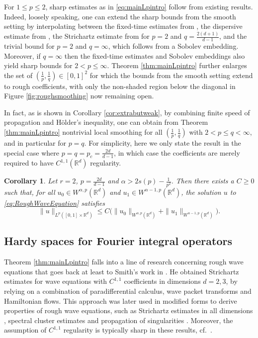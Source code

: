 \documentclass{amsart}
\numberwithin{equation}{section}
\newtheorem{corollary}[theorem]{Corollary}
\theoremstyle{definition}
\newcommand{\R}{\mathbb{R}}
\newcommand{\Rd}{\mathbb{R}^{d}}
\begin{document}
For $1\leq p\leq 2$, sharp estimates as in \eqref{eq:mainLpintro} follow from existing results.
Indeed, loosely speaking, one can extend the sharp bounds from the  smooth setting by 
interpolating between the fixed-time estimates from \cite{HassellRozendaal2023,LiRoSo25a}, the dispersive estimate from \cite{Geba-Tataru05}, the Strichartz estimate from \cite{Tataru2001} for $p=2$ and $q=\frac{2(d+1)}{d-1}$, and the trivial bound for $p=2$ and $q=\infty$, which follows from a Sobolev embedding. 
Moreover, if $q=\infty$ then the fixed-time estimates and Sobolev embeddings also yield sharp bounds for $2<p\leq \infty$. Theorem \ref{thm:mainLpintro} further enlarges the set of $(\frac{1}{p},\frac{1}{q})\in[0,1]^{2}$ for which the bounds from the smooth setting extend to rough coefficients, with only the non-shaded region below the diagonal in Figure \ref{fig:roughsmoothing} now remaining open.

In fact, as is shown in Corollary \ref{cor:extrabutweak}, by combining finite speed of propagation and H\"{o}lder's inequality, one can obtain from Theorem \ref{thm:mainLpintro} nontrivial local smoothing for all $(\frac{1}{p},\frac{1}{q})$ with $2<p\leq q<\infty$, and in particular for $p=q$. For simplicity, here we only state the result in the special case where $p=q=p_{c}=\frac{2d}{d-1}$, in which case the coefficients are merely required to have $C^{1,1}(\Rd)$ regularity.

\begin{corollary}\label{cor:extrabutweakintro}
Let $r=2$, $p=\frac{2d}{d-1}$ and $\alpha>2s(p)-\frac{1}{p^{2}}$. Then there exists a $C\geq0$ such that, for all $u_{0}\in W^{\alpha,p}(\R^d)$ and $u_{1}\in W^{\alpha-1,p}(\R^d)$, the solution $u$ to \eqref{eq:RoughWaveEquation} satisfies %
\[
\|u\|_{L^{p}([0,1]\times \R^d)}\leq C\big(\|u_{0}\|_{W^{\alpha,p}(\R^d)}+\|u_{1}\|_{W^{\alpha-1,p}(\R^d)}).
\]
\end{corollary}



\subsection{Hardy spaces for Fourier integral operators}

Theorem \ref{thm:mainLpintro} falls into a line of research concerning rough wave equations that goes back at least to Smith's work in \cite{Smith1998}. He obtained Strichartz estimates for wave equations with $C^{1,1}$ coefficients in dimensions $d=2,3$, by relying on a combination of paradifferential calculus, wave packet transforms and Hamiltonian flows. This approach was later used in modified forms to derive properties of rough wave equations, such as Strichartz estimates in all dimensions \cite{Tataru00,Tataru2001,Tataru02}, spectral cluster estimates \cite{Smith06} and propagation of singularities \cite{Smith14}. Moreover, the assumption of $C^{1,1}$ regularity is typically sharp in these results, cf.~\cite{SmithSogge1994,SmithTataru2002}.
\end{document}
